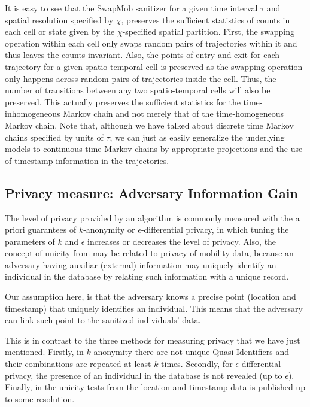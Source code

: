 \documentclass[review]{elsarticle}
\begin{document}
It is easy to see that the SwapMob sanitizer for a given time interval $\tau$ and spatial resolution specified by $\chi$, preserves the sufficient statistics of counts in each cell or state given by the $\chi$-specified spatial partition.  
First, the swapping operation within each cell only swaps random pairs of trajectories within it and thus leaves the counts invariant.  
Also, the points of entry and exit for each trajectory for a given spatio-temporal cell is preserved as the swapping operation only happens across random pairs of trajectories inside the cell.  
Thus, the number of transitions between any two spatio-temporal cells will also be preserved.  
This actually preserves the sufficient statistics for the time-inhomogeneous Markov chain and not merely that of the time-homogeneous Markov chain. 
Note that, although we have talked about discrete time Markov chains specified by units of $\tau$, we can just as easily generalize the underlying models to continuous-time Markov chains by appropriate projections and the use of timestamp information in the trajectories.   


\subsection{Privacy measure: Adversary Information Gain}\label{Sec:InfoGain}

The level of privacy provided by an algorithm is commonly measured with the a priori guarantees of $k$-anonymity or $\epsilon$-differential privacy, in which tuning the parameters of $k$ and $\epsilon$ increases or decreases the level of privacy.
Also, the concept of unicity from \cite{demontjoye2013} may be related to privacy of mobility data, because an adversary having auxiliar (external) information may uniquely identify an individual in the database by relating such information with a unique record.


Our assumption here, is that the adversary knows a precise point (location and timestamp) that uniquely identifies an individual. This means that the adversary can link such point to the sanitized individuals' data. 

This is in contrast to the three methods for measuring privacy that we have just mentioned.
Firstly, in $k$-anonymity there are not unique Quasi-Identifiers and their combinations are repeated at least $k$-times. Secondly, for $\epsilon$-differential privacy, the presence of an individual in the database is not revealed (up to $\epsilon$). Finally, in  the unicity tests from \cite{demontjoye2013} the location and timestamp data is published up to some resolution. 
\end{document}
